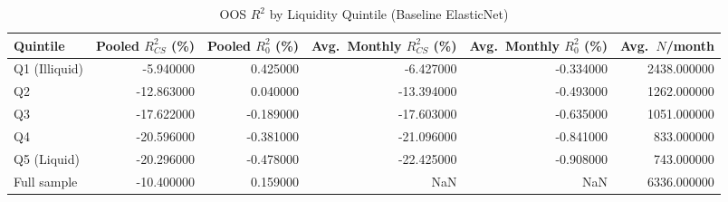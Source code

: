 \begin{table}
\caption{OOS $R^2$ by Liquidity Quintile (Baseline ElasticNet)}
\label{tab:r2_by_quintile_elasticnet}
\begin{tabular}{lrrrrr}
\toprule
Quintile & Pooled $R^2_{CS}$ (\%) & Pooled $R^2_{0}$ (\%) & Avg.\ Monthly $R^2_{CS}$ (\%) & Avg.\ Monthly $R^2_{0}$ (\%) & Avg.\ $N$/month \\
\midrule
Q1 (Illiquid) & -5.940000 & 0.425000 & -6.427000 & -0.334000 & 2438.000000 \\
Q2 & -12.863000 & 0.040000 & -13.394000 & -0.493000 & 1262.000000 \\
Q3 & -17.622000 & -0.189000 & -17.603000 & -0.635000 & 1051.000000 \\
Q4 & -20.596000 & -0.381000 & -21.096000 & -0.841000 & 833.000000 \\
Q5 (Liquid) & -20.296000 & -0.478000 & -22.425000 & -0.908000 & 743.000000 \\
Full sample & -10.400000 & 0.159000 & NaN & NaN & 6336.000000 \\
\bottomrule
\end{tabular}
\end{table}
